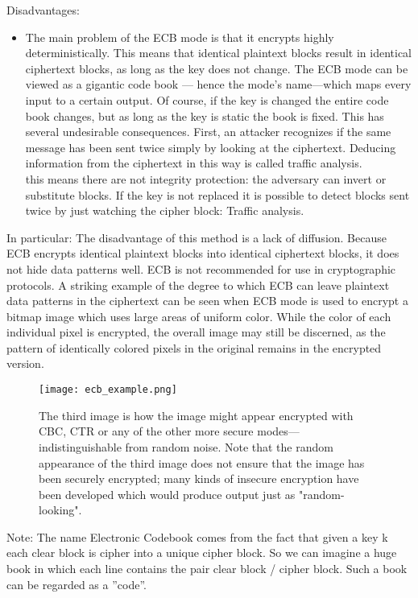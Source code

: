 \documentclass{article}
\begin{document}
Disadvantages:
\begin{itemize}
    \item 
    The
main problem of the ECB mode is that it encrypts highly deterministically. This
means that identical plaintext blocks result in identical ciphertext blocks, as long as
the key does not change. The ECB mode can be viewed as a gigantic code book —
hence the mode’s name—which maps every input to a certain output. Of course, if
the key is changed the entire code book changes, but as long as the key is static the
book is fixed. This has several undesirable consequences. First, an attacker recognizes
if the same message has been sent twice simply by looking at the ciphertext.
Deducing information from the ciphertext in this way is called traffic analysis.\\
this means there are not integrity protection: the adversary can invert or substitute blocks.
If the key is not replaced it is possible to detect blocks sent twice by just watching the
cipher block: Traffic analysis.
\end{itemize}
    In particular: The disadvantage of this method is a lack of diffusion. Because ECB encrypts identical plaintext blocks into identical ciphertext blocks, it does not hide data patterns well. ECB is not recommended for use in cryptographic protocols.
    A striking example of the degree to which ECB can leave plaintext data patterns in the ciphertext can be seen when ECB mode is used to encrypt a bitmap image which uses large areas of uniform color. While the color of each individual pixel is encrypted, the overall image may still be discerned, as the pattern of identically colored pixels in the original remains in the encrypted version.
    
\begin{figure}[H]
    \centering
    \texttt{[image: ecb\_example.png]}
    \caption{The third image is how the image might appear encrypted with CBC, CTR or any of the other more secure modes—indistinguishable from random noise. Note that the random appearance of the third image does not ensure that the image has been securely encrypted; many kinds of insecure encryption have been developed which would produce output just as "random-looking".}
\end{figure}

\par\bigskip 
\noindent

Note: The name Electronic Codebook comes from the fact that given a key k each clear block is
cipher into a unique cipher block. So we can imagine a huge book in which each line contains
the pair clear block / cipher block. Such a book can be regarded as a ”code”.
\end{document}

